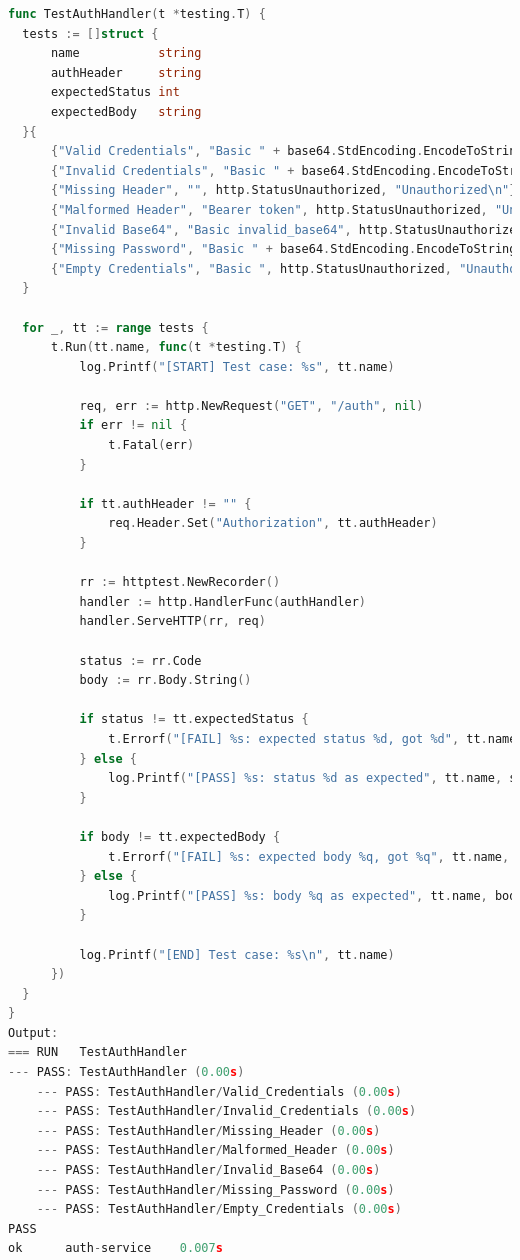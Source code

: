 \begin{lstlisting}[language=go, 
  basicstyle=\footnotesize\ttfamily,
  caption={Kode Unit Testing Pada Auth Service},
  label={lst:unit-test-auth-service}
]
func TestAuthHandler(t *testing.T) {
  tests := []struct {
      name           string
      authHeader     string
      expectedStatus int
      expectedBody   string
  }{
      {"Valid Credentials", "Basic " + base64.StdEncoding.EncodeToString([]byte("user:pass")), http.StatusOK, "OK"},
      {"Invalid Credentials", "Basic " + base64.StdEncoding.EncodeToString([]byte("wrong:pass")), http.StatusUnauthorized, "Unauthorized\n"},
      {"Missing Header", "", http.StatusUnauthorized, "Unauthorized\n"},
      {"Malformed Header", "Bearer token", http.StatusUnauthorized, "Unauthorized\n"},
      {"Invalid Base64", "Basic invalid_base64", http.StatusUnauthorized, "Unauthorized\n"},
      {"Missing Password", "Basic " + base64.StdEncoding.EncodeToString([]byte("user")), http.StatusUnauthorized, "Unauthorized\n"},
      {"Empty Credentials", "Basic ", http.StatusUnauthorized, "Unauthorized\n"},
  }

  for _, tt := range tests {
      t.Run(tt.name, func(t *testing.T) {
          log.Printf("[START] Test case: %s", tt.name)

          req, err := http.NewRequest("GET", "/auth", nil)
          if err != nil {
              t.Fatal(err)
          }

          if tt.authHeader != "" {
              req.Header.Set("Authorization", tt.authHeader)
          }

          rr := httptest.NewRecorder()
          handler := http.HandlerFunc(authHandler)
          handler.ServeHTTP(rr, req)

          status := rr.Code
          body := rr.Body.String()

          if status != tt.expectedStatus {
              t.Errorf("[FAIL] %s: expected status %d, got %d", tt.name, tt.expectedStatus, status)
          } else {
              log.Printf("[PASS] %s: status %d as expected", tt.name, status)
          }

          if body != tt.expectedBody {
              t.Errorf("[FAIL] %s: expected body %q, got %q", tt.name, tt.expectedBody, body)
          } else {
              log.Printf("[PASS] %s: body %q as expected", tt.name, body)
          }

          log.Printf("[END] Test case: %s\n", tt.name)
      })
  }
}
Output:
=== RUN   TestAuthHandler
--- PASS: TestAuthHandler (0.00s)
    --- PASS: TestAuthHandler/Valid_Credentials (0.00s)
    --- PASS: TestAuthHandler/Invalid_Credentials (0.00s)
    --- PASS: TestAuthHandler/Missing_Header (0.00s)
    --- PASS: TestAuthHandler/Malformed_Header (0.00s)
    --- PASS: TestAuthHandler/Invalid_Base64 (0.00s)
    --- PASS: TestAuthHandler/Missing_Password (0.00s)
    --- PASS: TestAuthHandler/Empty_Credentials (0.00s)
PASS
ok      auth-service    0.007s
\end{lstlisting}

